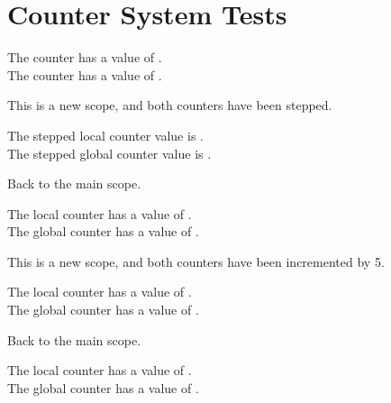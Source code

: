 \section{Counter System Tests}

    The counter has a value of .\\
    The counter has a value of .

    {
    This is a new scope, and both counters  have been stepped.

    The stepped local  counter value is .\\
    The stepped global counter value is .
    }

    Back to the main scope.

    The local  counter has a value of .\\
    The global counter has a value of .
    
    {
    This is a new scope, and both counters have been incremented by 5.

    The local  counter has a value of .\\
    The global counter has a value of .
    }
    
    Back to the main scope.

    The local  counter has a value of .\\
    The global counter has a value of .
    


